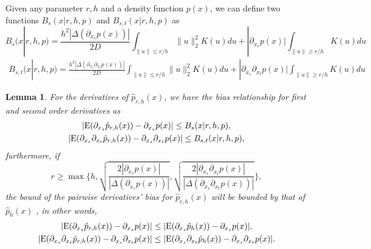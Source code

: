 \documentclass[aos,preprint]{imsart}
\newtheorem{lemma}[theorem]{Lemma}
\theoremstyle{remark}
\begin{document}
Given any parameter $r,h$ and a density function $p(x)$, we can define two functions $B_s(x| r,h, p)$ and $B_{s,t}(x| r,h, p)$ as
\[
B_s(x| r,h, p)  = \frac{h^2|\Delta (\partial_{x_s}p(x))|}{2D} \int_{\|u\|\leq r /h} \|u\|_2^2 K(u) du
+ |\partial_{x_s} p(x)| \int_{\|u\|\geq r/h} K(u) du
\]
\begin{multline*}
B_{s,t}(x|r,h, p) = \frac{h^2|\Delta (\partial_{x_s}\partial_{x_t} p(x))|}{2D}  \int_{\|u\|\leq r /h} \|u\|_2^2 K(u) du
 + |\partial_{x_s} \partial_{x_t} p(x)| \int_{\|u\|\geq r/h} K(u) du
\end{multline*}
\begin{lemma} \label{lSCRE}For the derivatives of $\hat{p}_{r,h}(x)$, we have the bias relationship for first and second order derivatives as
\begin{gather*}\label{order11}
|{\rm E}( \partial_{x_s}  \hat{p}_{r,h}(x)) -  \partial_{x_s } p(x)|  \leq B_s(x| r,h, p)  ,\\
|{\rm E} (\partial_{x_s} \partial_{x_t}   \hat{p}_{r, h}(x)) -  \partial_{x_s} \partial_{x_t} p(x)| \leq B_{s,t}(x| r,h, p),
\end{gather*}
furthermore, if  
\begin{equation}\label{condition1}
r \geq\max \{ h, \sqrt{\frac{2|\partial_{x_s} p(x)|}{ |\Delta(\partial_{x_s} p(x))|}} , \sqrt{\frac{2|\partial_{x_s} \partial_{x_t} p(x)|}{ |\Delta(\partial_{x_s}\partial_{x_t} p(x))|}}\},
\end{equation}
the bound of the pairwise derivatives' bias for $\hat{p}_{r,h}(x)$ %
will be bounded by that of $\hat{p}_h(x)$%
, in other words,
\begin{gather}\label{bias_bound2}
|{\rm E}( \partial_{x_s}  \hat{p}_{r,h}(x)) -  \partial_{x_s } p(x)| \leq |{\rm E}( \partial_{x_s}  \hat{p}_{h}(x)) -  \partial_{x_s } p(x)|,\\
|{\rm E}( \partial_{x_s} \partial_{x_t} \hat{p}_{r,h}(x)) - \partial_{x_s} \partial_{x_t} p(x)| \leq |{\rm E}( \partial_{x_s}  \partial_{x_t} \hat{p}_{h}(x)) -  \partial_{x_s }\partial_{x_t} p(x)|.\label{bias_bound3}
\end{gather}
\end{lemma}
\end{document}
